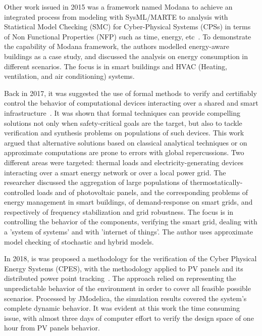 \documentclass[runningheads]{llncs}
\begin{document}
Other work issued in 2015 was a framework named Modana to achieve an integrated process from modeling with SysML/MARTE to analysis with Statistical Model Checking (SMC) for Cyber-Physical Systems (CPSs) in terms of Non Functional Properties (NFP) such as time, energy, etc~\cite{Cheng2015}. To demonstrate the capability of Modana framework, the authors modelled energy-aware buildings as a case study, and discussed the analysis on energy consumption in different scenarios. The focus is in smart buildings and HVAC (Heating, ventilation, and air conditioning) systems. %
 
Back in 2017, it was suggested the use of formal methods to verify and certifiably control the behavior of computational devices interacting over a shared and smart infrastructure~\cite{Abate2017}. It was shown that formal techniques can provide compelling solutions not only when safety-critical goals are the target, but also to tackle verification and synthesis problems on populations of such devices. This work argued that alternative solutions based on classical analytical techniques or on approximate computations are prone to errors with global repercussions. Two different areas were targeted: thermal loads and electricity-generating devices interacting over a smart energy network or over a local power grid. The researcher discussed the aggregation of large populations of thermostatically-controlled loads and of photovoltaic panels, and the corresponding problems of energy management in smart buildings, of demand-response on smart grids, and respectively of frequency stabilization and grid robustness. The focus is in controlling the behavior of the components, verifying the smart grid, dealing with a 'system of systems' and with 'internet of things'. The author uses approximate model checking of stochastic and hybrid models. %

In 2018, is was proposed a methodology for the verification of the Cyber Physical Energy Systems (CPES), with the methodology applied to PV panels and its distributed power point tracking~\cite{Driouich2018}. The approach relied on representing the unpredictable behavior of the environment in order to cover all feasible possible scenarios. Processed by JModelica, the simulation results covered the system's complete dynamic behavior. It was evident at this work the time consuming issue, with almost three days of computer effort to verify the design space of one hour from PV panels behavior. %
\end{document}
